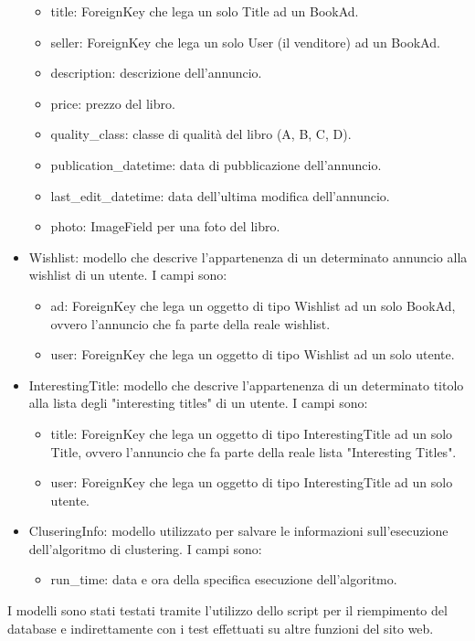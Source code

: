 \documentclass[10pt,a4paper]{report}
\begin{document}
\begin{itemize}
			\begin{itemize}
				\item title: ForeignKey che lega un solo Title ad un BookAd.
				\item seller: ForeignKey che lega un solo User (il venditore) ad un BookAd.
				\item description: descrizione dell'annuncio.
				\item price: prezzo del libro.
				\item quality\_class: classe di qualità del libro (A, B, C, D).
				\item publication\_datetime: data di pubblicazione dell'annuncio.
				\item last\_edit\_datetime: data dell'ultima modifica dell'annuncio.
				\item photo: ImageField per una foto del libro.
			\end{itemize}
		\item Wishlist: modello che descrive l'appartenenza di un determinato annuncio alla wishlist di un utente. I campi sono:
			\begin{itemize}
				\item ad: ForeignKey che lega un oggetto di tipo Wishlist ad un solo BookAd, ovvero l'annuncio che fa parte della reale wishlist.
				\item user: ForeignKey che lega un oggetto di tipo Wishlist ad un solo utente.
			\end{itemize}
		\item InterestingTitle: modello che descrive l'appartenenza di un determinato titolo alla lista degli "interesting titles" di un utente. I campi sono:
			\begin{itemize}
				\item title: ForeignKey che lega un oggetto di tipo InterestingTitle ad un solo Title, ovvero l'annuncio che fa parte della reale lista "Interesting Titles".
				\item user: ForeignKey che lega un oggetto di tipo InterestingTitle ad un solo utente.
			\end{itemize}
		\item CluseringInfo: modello utilizzato per salvare le informazioni sull'esecuzione dell'algoritmo di clustering. I campi sono: 
			\begin{itemize}
				\item run\_time: data e ora della specifica esecuzione dell'algoritmo.
			\end{itemize}
	\end{itemize}
	I modelli sono stati testati tramite l'utilizzo dello script per il riempimento del database e indirettamente con i test effettuati su altre funzioni del sito web.
	
\end{document}
